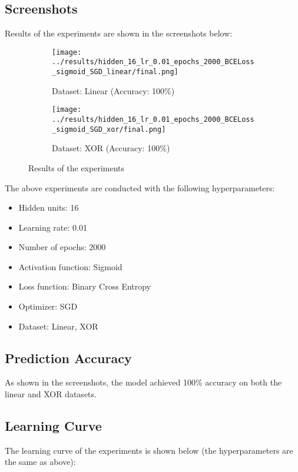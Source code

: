 \subsection{Screenshots}

Results of the experiments are shown in the screenshots below:

\begin{figure}[H]
    \centering
    \begin{subfigure}{0.5\textwidth}
        \centering
        \texttt{[image: ../results/hidden\_16\_lr\_0.01\_epochs\_2000\_BCELoss\_sigmoid\_SGD\_linear/final.png]}
        \caption{Dataset: Linear (Accuracy: 100\%)}
    \end{subfigure}%
    \begin{subfigure}{0.5\textwidth}
        \centering
        \texttt{[image: ../results/hidden\_16\_lr\_0.01\_epochs\_2000\_BCELoss\_sigmoid\_SGD\_xor/final.png]}
        \caption{Dataset: XOR (Accuracy: 100\%)}
    \end{subfigure}
    \caption{Results of the experiments}
\end{figure}

The above experiments are conducted with the following hyperparameters:

\begin{itemize}
    \item Hidden units: 16
    \item Learning rate: 0.01
    \item Number of epochs: 2000
    \item Activation function: Sigmoid
    \item Loss function: Binary Cross Entropy
    \item Optimizer: SGD
    \item Dataset: Linear, XOR
\end{itemize}

\subsection{Prediction Accuracy}

As shown in the screenshots, the model achieved 100\% accuracy on both the linear and XOR datasets.

\subsection{Learning Curve}

The learning curve of the experiments is shown below (the hyperparameters are the same as above):

